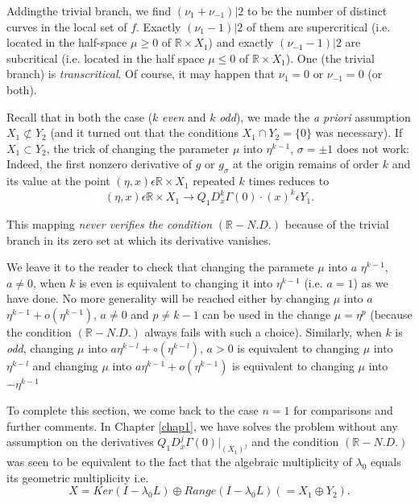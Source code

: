 Adding\pageoriginale the trivial branch, we find $(\nu_{1} + \nu_{-1})
|2$ to be the number of distinct curves in the local set of $f$. Exactly
$(\nu_{1} - 1)| 2$ of them are supercritical (i.e. located in the
half-space $\mu \geq 0$ of $\mathbb{R} \times X_{1}$) and exactly
$(\nu_{-1} - 1) | 2$ are subcritical (i.e. located in the half space
$\mu \leq 0$ of $\mathbb{R} \times X_{1}$). One (the trivial branch)
is {\em transcritical}. Of course, it may happen that $\nu_{1} = 0$ or
$\nu_{-1} = 0$ (or both).

\begin{remark}\label{chap3-rem2.6}
Recall that in both the case ($k$ {\em even} and $k$ {\em odd}), we made
the {\em a priori} assumption $X_{1} \nsubset Y_{2}$ (and it turned
out that the conditions $X_{1} \cap Y_{2} = \{0\}$ was necessary). If
$X_{1} \subset Y_{2}$, the trick of changing the parameter $\mu$ into
$\eta^{k-1}$, $\sigma = \pm 1$ does not work: Indeed, the first
nonzero derivative of $g$ or $g_{\sigma}$ at the origin remains of order
$k$ and its value at the point $(\eta, x) \epsilon \mathbb{R} \times
X_{1}$ repeated $k$ times reduces to
$$
(\eta, x) \epsilon \mathbb{R} \times X_{1} \to Q_{1}D_{x}^{k}\Gamma(0)
\cdot (x)^{k} \epsilon Y_{1}.
$$

This mapping {\em never verifies the condition} $(\mathbb{R}-N.D.)$ because
of the trivial branch in its zero set at which its derivative vanishes.
\end{remark}

\begin{remark}\label{chap3-rem2.7}
We leave it to the reader to check that changing the paramete $\mu$
into $a$ $\eta^{k-1}$, $a \neq 0$, when $k$ is even is equivalent to
changing it into $\eta^{k-1}$ (i.e. $a = 1$) as we have done. No more
generality will be reached either by changing $\mu$ into $a$ $\eta^{k-1}
+ o(\eta^{k-1})$, $a \neq 0$ and
$p \neq k-1$ can be used in the change $\mu = \eta^{p}$ (because the
condition $(\mathbb{R}-N.D.)$ always fails with such a
choice). Similarly, when $k$ is {\em odd}, changing $\mu$ into
$a \eta^{k-l} + \circ (\eta^{k-l})$, $a>0$ is equivalent to changing $\mu$ into $\eta^{k-l}$ and changing $\mu$ into $a \eta^{k-1} + o(\eta^{k-1})$
is equivalent to changing $\mu$ into $-\eta^{k-1}$ 
\end{remark}

To complete this section, we come back to the case $n = 1$ for
comparisons and further comments. In Chapter \ref{chap1}, we have
solves the problem without any assumption on the derivatives
$Q_{1}D_{x}^{j}\Gamma(0) |_{(X_{1})^j}$ and the condition
$(\mathbb{R}-N.D.)$ was seen to be equivalent to the fact that the
algebraic multiplicity of $\lambda_{0}$ equals its geometric
multiplicity i.e. 
\begin{equation*}
X = Ker (I - \lambda_{0}L) \oplus Range (I - \lambda_{0}L)(= X_{1}
\oplus Y_{2}).\tag{2.39}\label{chap3-eq2.39}
\end{equation*}

